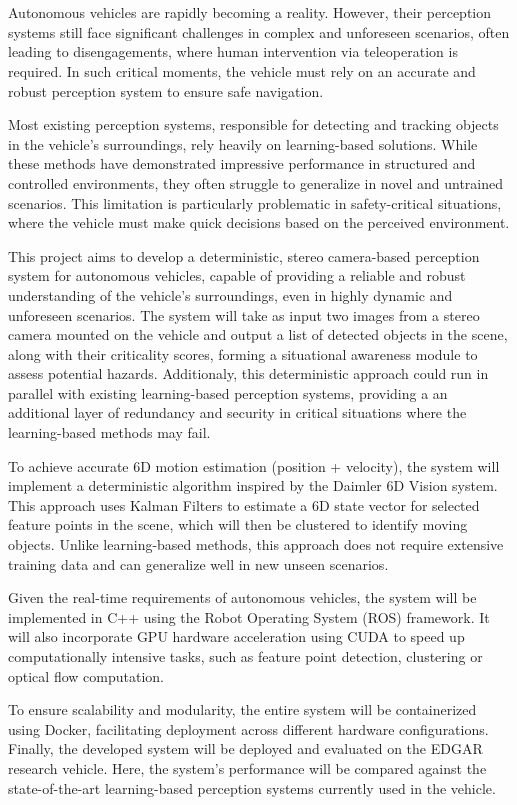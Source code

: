 \section{}%

Autonomous vehicles are rapidly becoming a reality. However, their perception systems still face significant challenges 
in complex and unforeseen scenarios, often leading to disengagements, where human intervention via teleoperation is required. 
In such critical moments, the vehicle must rely on an accurate and robust perception system to ensure safe navigation. 

Most existing perception systems, responsible for detecting and tracking objects in the vehicle's surroundings, rely heavily
on learning-based solutions. While these methods have demonstrated impressive performance in structured and controlled environments, 
they often struggle to generalize in novel and untrained scenarios. This limitation is particularly problematic in safety-critical
situations, where the vehicle must make quick decisions based on the perceived environment.

This project aims to develop a deterministic, stereo camera-based perception system for autonomous vehicles, capable of providing
a reliable and robust understanding of the vehicle's surroundings, even in highly dynamic and unforeseen scenarios. The system
will take as input two images from a stereo camera mounted on the vehicle and output a list of detected objects in the scene, along
with their criticality scores, forming a situational awareness module to assess potential hazards. 
Additionaly, this deterministic approach could run in parallel with existing learning-based perception systems, providing a
an additional layer of redundancy and security in critical situations where the learning-based methods may fail.

To achieve accurate 6D motion estimation (position + velocity), the system will implement a deterministic algorithm 
inspired by the Daimler 6D Vision system. This approach uses Kalman Filters to estimate a 6D state vector for selected feature
points in the scene, which will then be clustered to identify moving objects. Unlike learning-based methods, this approach
does not require extensive training data and can generalize well in new unseen scenarios.

Given the real-time requirements of autonomous vehicles, the system will be implemented in C++ using the Robot Operating System (ROS)
framework. It will also incorporate GPU hardware acceleration using CUDA to speed up computationally intensive tasks, such as
feature point detection, clustering or optical flow computation.  

To ensure scalability and modularity, the entire system will be containerized using Docker, facilitating deployment across different
hardware configurations. Finally, the developed system will be deployed and evaluated on the EDGAR research vehicle. Here, 
the system's performance will be compared against the state-of-the-art learning-based perception systems currently used in the vehicle.


